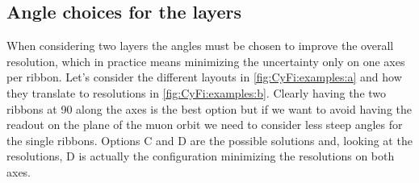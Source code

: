 \begin{refsection}
    \subsection{Angle choices for the layers}
        When considering two layers the angles must be chosen to improve the overall resolution, which in practice means minimizing the uncertainty only on one axes per ribbon.
        Let's consider the different layouts in \ref{fig:CyFi:examples:a} and how they translate to resolutions in \ref{fig:CyFi:examples:b}.
        Clearly having the two ribbons at \SI{90}{\deg} along the axes is the best option but if we want to avoid having the readout on the plane of the muon orbit we need to consider less steep angles for the single ribbons.
        Options C and D are the possible solutions and, looking at the resolutions, D is actually the configuration minimizing the resolutions on both axes. 


\end{refsection}
